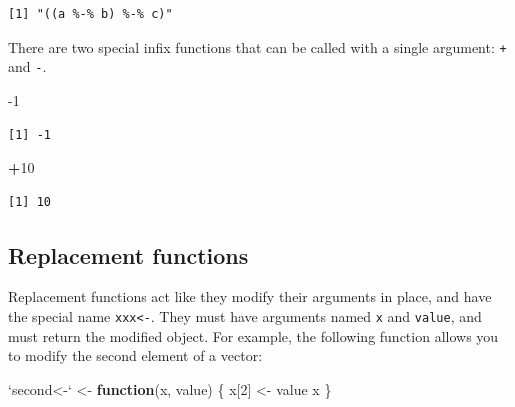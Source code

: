 \documentclass[]{book}
\newenvironment{Shaded}{\begin{snugshade}}{\end{snugshade}}
\newcommand{\ControlFlowTok}[1]{\textcolor[rgb]{0.13,0.29,0.53}{\textbf{#1}}}
\newcommand{\DataTypeTok}[1]{\textcolor[rgb]{0.13,0.29,0.53}{#1}}
\newcommand{\DecValTok}[1]{\textcolor[rgb]{0.00,0.00,0.81}{#1}}
\newcommand{\KeywordTok}[1]{\textcolor[rgb]{0.13,0.29,0.53}{\textbf{#1}}}
\newcommand{\NormalTok}[1]{#1}
\newcommand{\OperatorTok}[1]{\textcolor[rgb]{0.81,0.36,0.00}{\textbf{#1}}}
\newcommand{\StringTok}[1]{\textcolor[rgb]{0.31,0.60,0.02}{#1}}
\theoremstyle{definition}
\theoremstyle{definition}
\theoremstyle{definition}
\theoremstyle{remark}
\begin{document}
\begin{Shaded}
\end{Shaded}

\begin{verbatim}
[1] "((a %-% b) %-% c)"
\end{verbatim}

There are two special infix functions that can be called with a single
argument: \texttt{+} and \texttt{-}.

\begin{Shaded}
\begin{Highlighting}[]
\DecValTok{-1}
\end{Highlighting}
\end{Shaded}

\begin{verbatim}
[1] -1
\end{verbatim}

\begin{Shaded}
\begin{Highlighting}[]
\OperatorTok{+}\DecValTok{10}
\end{Highlighting}
\end{Shaded}

\begin{verbatim}
[1] 10
\end{verbatim}

\hypertarget{replacement-functions}{%
\subsection{Replacement functions}\label{replacement-functions}}

Replacement functions act like they modify their arguments in place, and
have the special name \texttt{xxx\textless{}-}. They must have arguments
named \texttt{x} and \texttt{value}, and must return the modified
object. For example, the following function allows you to modify the
second element of a vector:

\begin{Shaded}
\begin{Highlighting}[]
\StringTok{`}\DataTypeTok{second<-}\StringTok{`}\NormalTok{ <-}\StringTok{ }\ControlFlowTok{function}\NormalTok{(x, value) \{}
\NormalTok{  x[}\DecValTok{2}\NormalTok{] <-}\StringTok{ }\NormalTok{value}
\NormalTok{  x}
\NormalTok{\}}
\end{Highlighting}
\end{Shaded}
\end{document}
